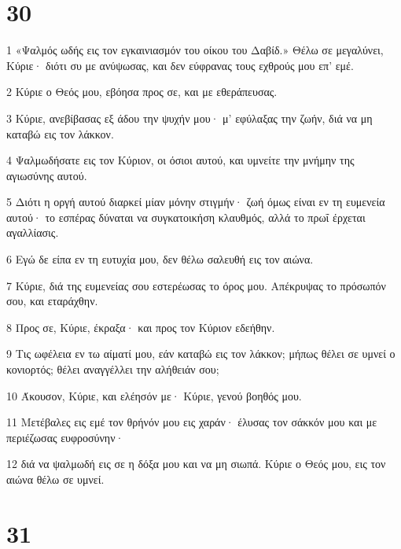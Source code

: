 \chapter{30}

\par 1 «Ψαλμός ωδής εις τον εγκαινιασμόν του οίκου του Δαβίδ.» Θέλω σε μεγαλύνει, Κύριε· διότι συ με ανύψωσας, και δεν εύφρανας τους εχθρούς μου επ' εμέ.
\par 2 Κύριε ο Θεός μου, εβόησα προς σε, και με εθεράπευσας.
\par 3 Κύριε, ανεβίβασας εξ άδου την ψυχήν μου· μ' εφύλαξας την ζωήν, διά να μη καταβώ εις τον λάκκον.
\par 4 Ψαλμωδήσατε εις τον Κύριον, οι όσιοι αυτού, και υμνείτε την μνήμην της αγιωσύνης αυτού.
\par 5 Διότι η οργή αυτού διαρκεί μίαν μόνην στιγμήν· ζωή όμως είναι εν τη ευμενεία αυτού· το εσπέρας δύναται να συγκατοικήση κλαυθμός, αλλά το πρωΐ έρχεται αγαλλίασις.
\par 6 Εγώ δε είπα εν τη ευτυχία μου, δεν θέλω σαλευθή εις τον αιώνα.
\par 7 Κύριε, διά της ευμενείας σου εστερέωσας το όρος μου. Απέκρυψας το πρόσωπόν σου, και εταράχθην.
\par 8 Προς σε, Κύριε, έκραξα· και προς τον Κύριον εδεήθην.
\par 9 Τις ωφέλεια εν τω αίματί μου, εάν καταβώ εις τον λάκκον; μήπως θέλει σε υμνεί ο κονιορτός; θέλει αναγγέλλει την αλήθειάν σου;
\par 10 Άκουσον, Κύριε, και ελέησόν με· Κύριε, γενού βοηθός μου.
\par 11 Μετέβαλες εις εμέ τον θρήνόν μου εις χαράν· έλυσας τον σάκκόν μου και με περιέζωσας ευφροσύνην·
\par 12 διά να ψαλμωδή εις σε η δόξα μου και να μη σιωπά. Κύριε ο Θεός μου, εις τον αιώνα θέλω σε υμνεί.

\chapter{31}

